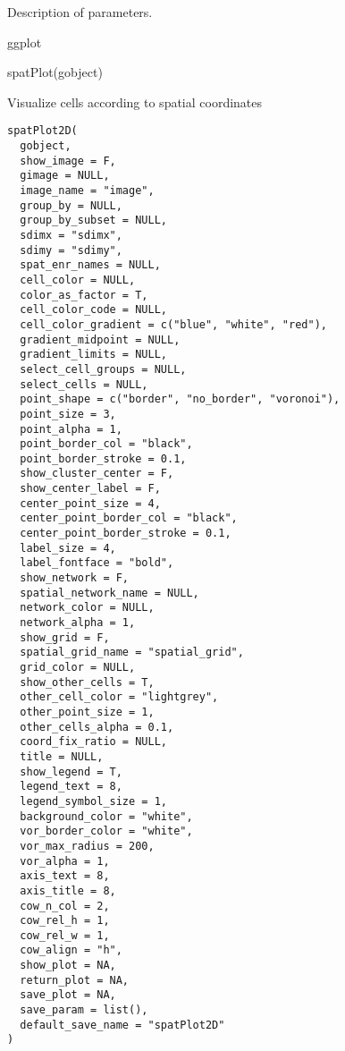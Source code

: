 \documentclass[a4paper]{book}
\begin{document}
%
\begin{Details}\relax
Description of parameters.
\end{Details}
%
\begin{Value}
ggplot
\end{Value}
%
\begin{SeeAlso}\relax
{}
\end{SeeAlso}
%
\begin{Examples}
\begin{ExampleCode}
    spatPlot(gobject)
\end{ExampleCode}
\end{Examples}
%
\begin{Description}\relax
Visualize cells according to spatial coordinates
\end{Description}
%
\begin{Usage}
\begin{verbatim}
spatPlot2D(
  gobject,
  show_image = F,
  gimage = NULL,
  image_name = "image",
  group_by = NULL,
  group_by_subset = NULL,
  sdimx = "sdimx",
  sdimy = "sdimy",
  spat_enr_names = NULL,
  cell_color = NULL,
  color_as_factor = T,
  cell_color_code = NULL,
  cell_color_gradient = c("blue", "white", "red"),
  gradient_midpoint = NULL,
  gradient_limits = NULL,
  select_cell_groups = NULL,
  select_cells = NULL,
  point_shape = c("border", "no_border", "voronoi"),
  point_size = 3,
  point_alpha = 1,
  point_border_col = "black",
  point_border_stroke = 0.1,
  show_cluster_center = F,
  show_center_label = F,
  center_point_size = 4,
  center_point_border_col = "black",
  center_point_border_stroke = 0.1,
  label_size = 4,
  label_fontface = "bold",
  show_network = F,
  spatial_network_name = NULL,
  network_color = NULL,
  network_alpha = 1,
  show_grid = F,
  spatial_grid_name = "spatial_grid",
  grid_color = NULL,
  show_other_cells = T,
  other_cell_color = "lightgrey",
  other_point_size = 1,
  other_cells_alpha = 0.1,
  coord_fix_ratio = NULL,
  title = NULL,
  show_legend = T,
  legend_text = 8,
  legend_symbol_size = 1,
  background_color = "white",
  vor_border_color = "white",
  vor_max_radius = 200,
  vor_alpha = 1,
  axis_text = 8,
  axis_title = 8,
  cow_n_col = 2,
  cow_rel_h = 1,
  cow_rel_w = 1,
  cow_align = "h",
  show_plot = NA,
  return_plot = NA,
  save_plot = NA,
  save_param = list(),
  default_save_name = "spatPlot2D"
)
\end{verbatim}
\end{Usage}
\end{document}
